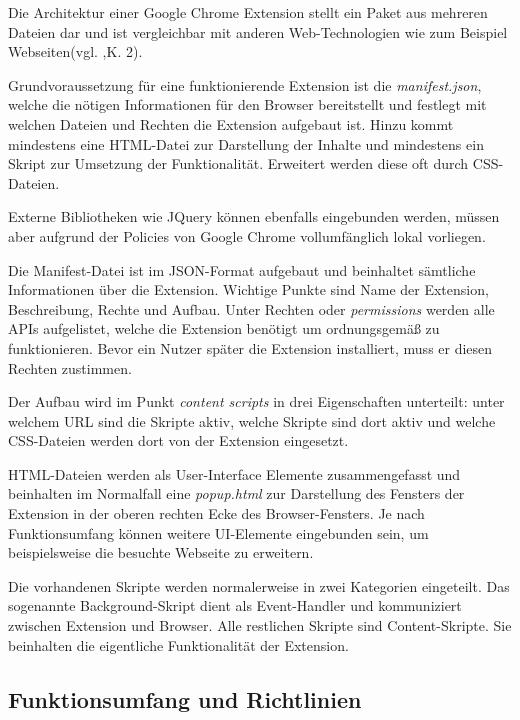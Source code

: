 Die Architektur einer Google Chrome Extension stellt ein Paket aus mehreren Dateien dar und ist vergleichbar mit anderen Web-Technologien wie zum Beispiel Webseiten(vgl. \cite{extension},K. 2).

Grundvoraussetzung für eine funktionierende Extension ist die \textit{manifest.json}, welche die nötigen Informationen für den Browser bereitstellt und festlegt mit welchen Dateien und Rechten die Extension aufgebaut ist. Hinzu kommt mindestens eine HTML-Datei zur Darstellung der Inhalte und mindestens ein Skript zur Umsetzung der Funktionalität. Erweitert werden diese oft durch CSS-Dateien.

Externe Bibliotheken wie JQuery können ebenfalls eingebunden werden, müssen aber aufgrund der Policies\cite{chrome} von Google Chrome vollumfänglich lokal vorliegen.

Die Manifest-Datei ist im JSON-Format aufgebaut und beinhaltet sämtliche Informationen über die Extension. Wichtige Punkte sind Name der Extension, Beschreibung, Rechte und Aufbau. Unter Rechten oder \textit{permissions} werden alle APIs aufgelistet, welche die Extension benötigt um ordnungsgemäß zu funktionieren. Bevor ein Nutzer später die Extension installiert, muss er diesen Rechten zustimmen.

Der Aufbau wird im Punkt \textit{content scripts} in drei Eigenschaften unterteilt: unter welchem URL sind die Skripte aktiv, welche Skripte sind dort aktiv und welche CSS-Dateien werden dort von der Extension eingesetzt.

HTML-Dateien werden als \glqq User-Interface Elemente\grqq{} zusammengefasst und beinhalten im Normalfall eine \textit{popup.html} zur Darstellung des Fensters der Extension in der oberen rechten Ecke des Browser-Fensters. Je nach Funktionsumfang können weitere UI-Elemente eingebunden sein, um beispielsweise die besuchte Webseite zu erweitern.

Die vorhandenen Skripte werden normalerweise in zwei Kategorien eingeteilt. Das sogenannte \glqq Background-Skript\grqq{} dient als Event-Handler und kommuniziert zwischen Extension und Browser. Alle restlichen Skripte sind \glqq Content-Skripte\grqq{}. Sie beinhalten die eigentliche Funktionalität der Extension. 

\subsection{Funktionsumfang und Richtlinien}
\label{ss:funktionsumfang}

